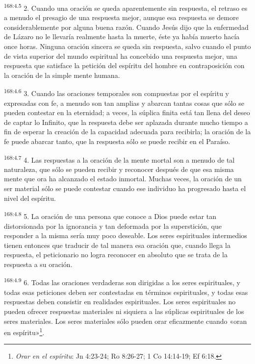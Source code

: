\par
\textsuperscript{168:4.5} 2. Cuando una oración se queda aparentemente sin respuesta, el retraso es a menudo el presagio de una respuesta mejor, aunque esa respuesta se demore considerablemente por alguna buena razón. Cuando Jesús dijo que la enfermedad de Lázaro no le llevaría realmente hasta la muerte, éste ya había muerto hacía once horas. Ninguna oración sincera se queda sin respuesta, salvo cuando el punto de vista superior del mundo espiritual ha concebido una respuesta mejor, una respuesta que satisface la petición del espíritu del hombre en contraposición con la oración de la simple mente humana.

\par
\textsuperscript{168:4.6} 3. Cuando las oraciones temporales son compuestas por el espíritu y expresadas con fe, a menudo son tan amplias y abarcan tantas cosas que sólo se pueden contestar en la eternidad; a veces, la súplica finita está tan llena del deseo de captar lo Infinito, que la respuesta debe ser aplazada durante mucho tiempo a fin de esperar la creación de la capacidad adecuada para recibirla; la oración de la fe puede abarcar tanto, que la respuesta sólo se puede recibir en el Paraíso.

\par
\textsuperscript{168:4.7} 4. Las respuestas a la oración de la mente mortal son a menudo de tal naturaleza, que sólo se pueden recibir y reconocer después de que esa misma mente que ora ha alcanzado el estado inmortal. Muchas veces, la oración de un ser material sólo se puede contestar cuando ese individuo ha progresado hasta el nivel del espíritu.

\par
\textsuperscript{168:4.8} 5. La oración de una persona que conoce a Dios puede estar tan distorsionada por la ignorancia y tan deformada por la superstición, que responder a la misma sería muy poco deseable. Los seres espirituales intermedios tienen entonces que traducir de tal manera esa oración que, cuando llega la respuesta, el peticionario no logra reconocer en absoluto que se trata de la respuesta a su oración.

\par
\textsuperscript{168:4.9} 6. Todas las oraciones verdaderas son dirigidas a los seres espirituales, y todas esas peticiones deben ser contestadas en términos espirituales, y todas esas respuestas deben consistir en realidades espirituales. Los seres espirituales no pueden ofrecer respuestas materiales ni siquiera a las súplicas espirituales de los seres materiales. Los seres materiales sólo pueden orar eficazmente cuando «oran en espíritu»\footnote{\textit{Orar en el espíritu}: Jn 4:23-24; Ro 8:26-27; 1 Co 14:14-19; Ef 6:18.}.

